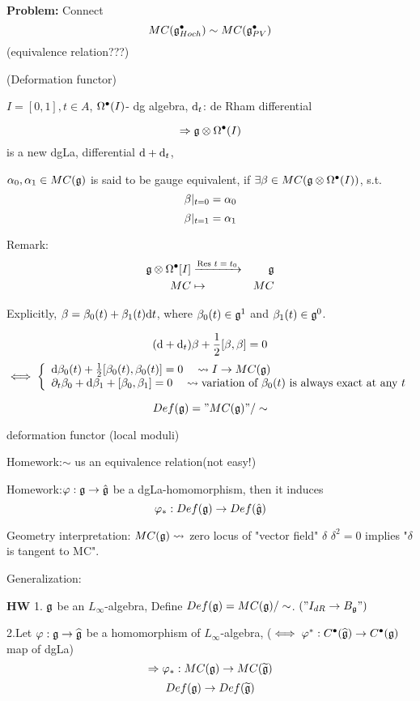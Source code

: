 \textbf{Problem:} Connect 
$$MC(\mathfrak{g}_{Hoch}^{\bullet})\sim MC(\mathfrak{g}_{PV}^{\bullet})$$
(equivalence relation???)


(Deformation functor)

$I=[0,1],t\in A$, $\Omega^{\bullet}(I)$- dg algebra, $\mathrm{d}_t$: de Rham differential

$$\Rightarrow \mathfrak{g}\otimes\Omega^{\bullet}(I)$$
is a new dgLa, differential $\mathrm{d}+\mathrm{d}_t$,

\begin{definition}
$\alpha_0,\alpha_1\in MC(\mathfrak{g})$ is said to be gauge equivalent, 
if $\exists\beta\in MC(\mathfrak{g}\otimes\Omega^{\bullet}(I))$, s.t.
$$\beta|_{t=0}=\alpha_0$$
$$\beta|_{t=1}=\alpha_1$$
\end{definition}

Remark:
\begin{eqnarray*}
\mathfrak{g}\otimes\Omega^{\bullet}[I]&\xrightarrow{\text{Res $t=t_0$}}&\mathfrak{g}\\
MC&\mapsto& MC
\end{eqnarray*}

Explicitly, $\beta=\beta_0(t)+\beta_1(t)\mathrm{d} t$,
where $\beta_0(t)\in\mathfrak{g}^1$ and $\beta_1(t)\in\mathfrak{g}^0$.

$$(\mathrm{d}+\mathrm{d}_t)\beta+\frac{1}{2}[\beta,\beta]=0$$
$$\iff
  \left\{
    \begin{array}{l}
      \mathrm{d}\beta_0(t)+\frac{1}{2}[\beta_0(t),\beta_0(t)]=0
      \quad\rightsquigarrow I\to MC(\mathfrak{g})
    \\
      \partial_t\beta_0+\mathrm{d}\beta_1+[\beta_0,\beta_1]=0
      \quad\rightsquigarrow\text{variation of $\beta_0(t)$ is always exact at any $t$}
    \end{array}
  \right.
$$

\begin{definition}
$$Def(\mathfrak{g})="MC(\mathfrak{g})"/\sim$$
\end{definition}
deformation functor (local moduli)

Homework:$\sim$ us an equivalence relation(not easy!)

Homework:$\varphi:\mathfrak{g}\to\hat{\mathfrak{g}}$ be a dgLa-homomorphism, 
then it induces 
$$\varphi_*:Def(\mathfrak{g})\to Def(\hat{\mathfrak{g}})$$

Geometry interpretation:
$MC(\mathfrak{g})\rightsquigarrow$ zero locus of "vector field" $\delta$
$\delta^2=0$ implies "$\delta$ is tangent to MC".

Generalization:

\textbf{HW} 1. $\mathfrak{g}$ be an $L_\infty$-algebra, 
Define $Def(\mathfrak{g})=MC(\mathfrak{g})/\sim$.
$("I_{dR}\to B_{\mathfrak{g}}")$

2.Let $\varphi:\mathfrak{g}\to\widehat{\mathfrak{g}}$ be a homomorphism of $L_\infty$-algebra,
($\iff \varphi^*: C^{\bullet}(\widehat{\mathfrak{g}})\to C^{\bullet}(\mathfrak{g})$ map of dgLa)
$$\Rightarrow\varphi_*:MC(\mathfrak{g})\to MC(\widetilde{\mathfrak{g}})$$
$$Def(\mathfrak{g})\to Def(\widetilde{\mathfrak{g}})$$


